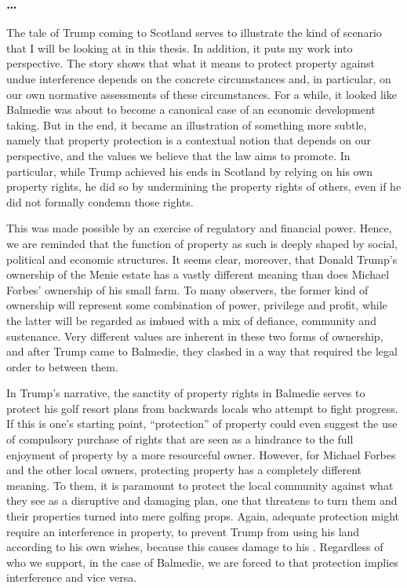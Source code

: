 \subsubsection*{\ldots}

The tale of Trump coming to Scotland serves to illustrate the kind of scenario that I will be looking at in this thesis. In addition, it puts my work into perspective. The story shows that what it means to protect property against undue interference depends on the concrete circumstances and, in particular, on our own normative assessments of these circumstances. For a while, it looked like Balmedie was about to become a canonical case of an economic development taking. But in the end, it became an illustration of something more subtle, namely that property protection is a contextual notion that depends on our perspective, and the values we believe that the law aims to promote. In particular, while Trump achieved his ends in Scotland by relying on his own property rights, he did so by undermining the property rights of others, even if he did not formally condemn those rights.

This was made possible by an exercise of regulatory and financial power. Hence, we are reminded that the function of property as such is deeply shaped by social, political and economic structures. It seems clear, moreover, that Donald Trump's ownership of the Menie estate has a vastly different meaning than does Michael Forbes' ownership of his small farm. To many observers, the former kind of ownership will represent some combination of power, privilege and profit, while the latter will be regarded as imbued with a mix of defiance, community and sustenance. Very different values are inherent in these two forms of ownership, and after Trump came to Balmedie, they clashed in a way that required the legal order to  between them.

In Trump's narrative, the sanctity of property rights in Balmedie serves to protect his golf resort plans from backwards locals who attempt to fight progress. If this is one's starting point, ``protection'' of property could even suggest the use of compulsory purchase of rights that are seen as a hindrance to the full enjoyment of property by a more resourceful owner. However, for Michael Forbes and the other local owners, protecting property has a completely different meaning. To them, it is paramount to protect the local community against what they see as a disruptive and damaging plan, one that threatens to turn them and their properties turned into mere golfing props. Again, adequate protection might require an interference in property, to prevent Trump from using his land according to his own wishes, because this causes damage to his . Regardless of who we support, in the case of Balmedie, we are forced to  that protection implies interference and vice versa. 

